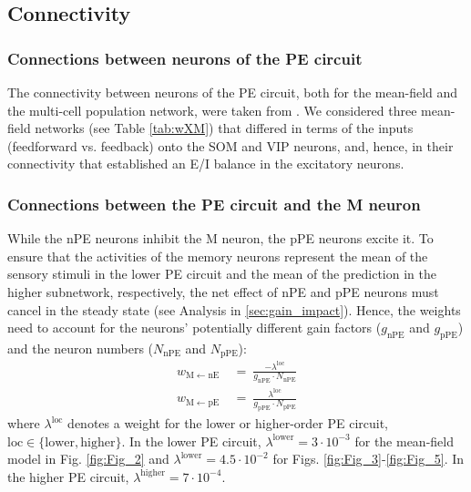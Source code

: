 \documentclass[10pt,a4paper]{article}
\begin{document}
\subsection{Connectivity}
%
%
\subsubsection{Connections between neurons of the PE circuit}
%
The connectivity between neurons of the PE circuit, both for the mean-field and the multi-cell population network, were taken from \citep{hertag2022prediction}. We considered three mean-field networks (see Table \ref{tab:wXM}) that differed in terms of the inputs (feedforward vs. feedback) onto the SOM and VIP neurons, and, hence, in their connectivity that established an E/I balance in the excitatory neurons.

\subsubsection{Connections between the PE circuit and the M neuron}
%
While the nPE neurons inhibit the M neuron, the pPE neurons excite it. To ensure that the activities of the memory neurons represent the mean of the sensory stimuli in the lower PE circuit and the mean of the prediction in the higher subnetwork, respectively, the net effect of nPE and pPE neurons must cancel in the steady state (see Analysis in \ref{sec:gain_impact}). Hence, the weights need to account for the neurons' potentially different gain factors ($g_\mathrm{nPE}$ and $g_\mathrm{pPE}$) and the neuron numbers ($N_\mathrm{nPE}$ and $N_\mathrm{pPE}$):
%
\begin{align*}
w_\mathrm{M\leftarrow nE}\  &=\ \frac{-\lambda^\mathrm{loc}}{g_\mathrm{nPE} \cdot N_\mathrm{nPE}} \nonumber\\
w_\mathrm{M\leftarrow pE}\  &=\ \frac{\lambda^\mathrm{loc}}{g_\mathrm{pPE} \cdot N_\mathrm{pPE}}
\end{align*}
%
where $\lambda^\mathrm{loc}$ denotes a weight for the lower or higher-order PE circuit, $\mathrm{loc}\in\lbrace\mathrm{lower}, \mathrm{higher}\rbrace$. In the lower PE circuit,  $\lambda^\mathrm{lower}=3\cdot 10^{-3}$ for the mean-field model in Fig. \ref{fig:Fig_2} and $\lambda^\mathrm{lower}=4.5\cdot 10^{-2}$ for Figs. \ref{fig:Fig_3}-\ref{fig:Fig_5}. In the higher PE circuit, $\lambda^\mathrm{higher} = 7\cdot 10^{-4}$.
\end{document}
